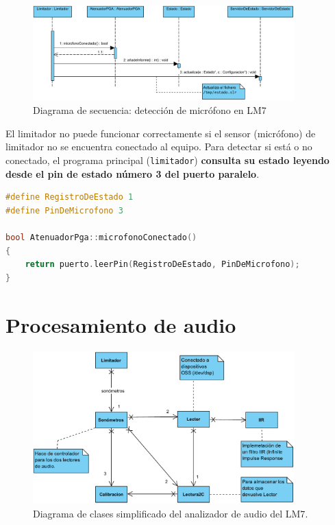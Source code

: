 \begin{figure}[h]
    \centering
    \includegraphics[width=0.9\textwidth]{figuras/lms7-mic-detection.pdf}
    \caption{Diagrama de secuencia: detección de micrófono en \acrshort{LM7}}
    \label{fig:lm7-mic-detection}
\end{figure}


El limitador no puede funcionar correctamente si el sensor (micrófono) de limitador no se encuentra conectado al equipo. Para detectar si está o no conectado, el programa principal (\verb|limitador|) \textbf{consulta su estado leyendo desde el pin de estado número 3 del puerto paralelo}. \\

\begin{lstlisting}[language=c++, caption=Detección de micrófono en C++.]
#define RegistroDeEstado 1
#define PinDeMicrofono 3

bool AtenuadorPga::microfonoConectado()
{
	return puerto.leerPin(RegistroDeEstado, PinDeMicrofono);
}
\end{lstlisting}


\section{Procesamiento de audio}

\begin{figure}[h]
    \centering
    \includegraphics[width=0.9\textwidth]{figuras/lms7-analyzer.pdf}

    \caption{Diagrama de clases simplificado del analizador de audio del \acrshort{LM7}.}
    \label{fig:lm7-analyzer}
\end{figure}

